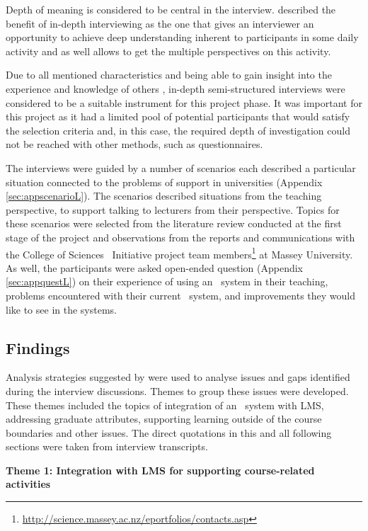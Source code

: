 Depth of meaning is considered to be central in the interview.
\citet{Johnson2001} described the benefit of in-depth interviewing as the one
that gives an interviewer an opportunity to achieve deep understanding inherent
to participants in some daily activity and as well allows to get the multiple
perspectives on this activity.

Due to all mentioned characteristics and being able to gain insight into the
experience and knowledge of others \citep{Schostak2006}, in-depth
semi-structured interviews were considered to be a suitable instrument for this
project phase. It was important for this project as it had a limited pool of 
potential participants that would satisfy the selection criteria and, in this
case, the required depth of investigation could not be reached with other
methods, such as questionnaires.

The interviews were guided by a number of scenarios each described a particular
situation connected to the problems of \LLLs support in universities (Appendix
\ref{sec:appscenarioL}). The scenarios described situations from the teaching
perspective, to support talking to lecturers from their perspective. Topics for
these scenarios were selected from the literature review conducted at the first
stage of the project and observations from the reports and communications with
the College of Sciences \ep~Initiative project team
members\footnote{\url{http://science.massey.ac.nz/eportfolios/contacts.asp}} at
Massey University. As well, the participants were asked open-ended question
(Appendix \ref{sec:appquestL}) on their experience of using an \ep~system in
their teaching, problems encountered with their current \ep~system, and
improvements they would like to see in the systems.

\subsection{Findings}

Analysis strategies suggested by \citet{Marshall2010} were used to analyse
issues and gaps identified during the interview discussions. Themes to group
these issues were developed. These themes included the topics of integration of
an \ep~system with LMS, addressing graduate attributes, supporting learning
outside of the course boundaries and other issues. The direct quotations in this
and all following sections were taken from interview transcripts.

\textbf{Theme 1: Integration with LMS for supporting course-related activities}

